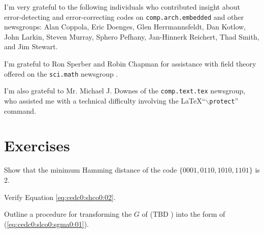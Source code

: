I'm very grateful to the following individuals who contributed insight
about error-detecting and error-correcting
codes on \texttt{comp.arch.embedded}
and other
newsgroups:
Alan Coppola,
Eric Doenges,
Glen Herrmannsfeldt,
Dan Kotlow,
John Larkin,
Steven Murray,
Sphero Pefhany,
Jan-Hinnerk Reichert,
Thad Smith,
and
Jim Stewart.

I'm grateful to 
   Ron Sperber   \cite{bibref:i:ronsperber} and
 Robin Chapman \cite{bibref:i:robinchapman}
for assistance with field theory offered on the 
\texttt{sci.math} newsgroup \cite{bibref:n:scimathnewsgroup}.

I'm also grateful to Mr. Michael J. Downes of the 
\texttt{comp.text.tex} 
newsgroup, who assisted me with a technical difficulty involving
the \LaTeX ``$\backslash$\texttt{protect}'' command.


\section{Exercises}
\label{cedc0:sexe0}

\begin{vworkexercisestatement}
\label{exe:cedc0:sexe0:01}
Show that the minimum Hamming distance of the code $\{0001, 0110, 1010, 1101\}$
is 2.
\end{vworkexercisestatement}

\begin{vworkexercisestatement}
\label{exe:cedc0:sexe0:02}
Verify Equation \ref{eq:cedc0:shco0:02}.
\end{vworkexercisestatement}

\begin{vworkexercisestatement}
\label{exe:cedc0:sexe0:03}
Outline a procedure for transforming the $G$ of 
(TBD%
) into 
the form of (\ref{eq:cedc0:slco0:sgma0:01}).
\end{vworkexercisestatement}
\vworkexercisefooter{}

\vworkexercisefooter{}


